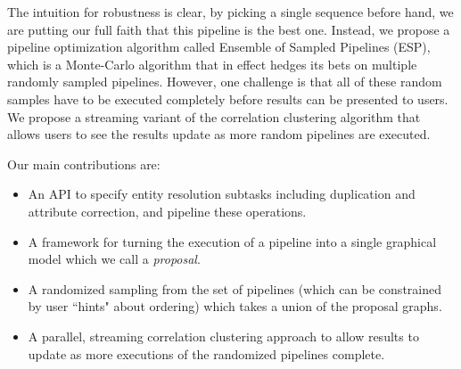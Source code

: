 The intuition for robustness is clear, by picking a single sequence before hand, we are putting our full faith that this pipeline is the best one.
Instead, we propose a pipeline optimization algorithm called Ensemble of Sampled Pipelines (ESP), which is a Monte-Carlo algorithm that in effect hedges its bets on multiple randomly sampled pipelines.
However, one challenge is that all of these random samples have to be executed completely before results can be presented to users.
We propose a streaming variant of the correlation clustering algorithm that allows users to see the results update as more random pipelines are executed.

Our main contributions are:
\begin{itemize}
\item An API to specify entity resolution subtasks including duplication and attribute correction, and pipeline these operations.
\item A framework for turning the execution of a pipeline into a single graphical model which we call a \emph{proposal}.
\item A randomized sampling from the set of pipelines (which can be constrained by user ``hints" about ordering) which takes a union of the proposal graphs.
\item A parallel, streaming correlation clustering approach to allow results to update as more executions of the randomized pipelines complete. 
\end{itemize}









